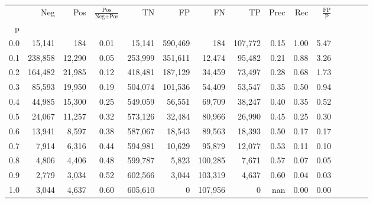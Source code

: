 \begin{tabular}{rrrcrrrrrrrrrrr}
\toprule
{} &      Neg &     Pos & $\frac{\text{Pos}}{\text{Neg}+\text{Pos}}$ &       TN &       FP &       FN &       TP &  Prec &   Rec & $\frac{\text{FP}}{\text{P}}$ \\
p   &          &         &                                            &          &          &          &          &       &       &                              \\
\midrule
0.0 &   15,141 &     184 &                                       0.01 &   15,141 &  590,469 &      184 &  107,772 &  0.15 &  1.00 &                         5.47 \\
0.1 &  238,858 &  12,290 &                                       0.05 &  253,999 &  351,611 &   12,474 &   95,482 &  0.21 &  0.88 &                         3.26 \\
0.2 &  164,482 &  21,985 &                                       0.12 &  418,481 &  187,129 &   34,459 &   73,497 &  0.28 &  0.68 &                         1.73 \\
0.3 &   85,593 &  19,950 &                                       0.19 &  504,074 &  101,536 &   54,409 &   53,547 &  0.35 &  0.50 &                         0.94 \\
0.4 &   44,985 &  15,300 &                                       0.25 &  549,059 &   56,551 &   69,709 &   38,247 &  0.40 &  0.35 &                         0.52 \\
0.5 &   24,067 &  11,257 &                                       0.32 &  573,126 &   32,484 &   80,966 &   26,990 &  0.45 &  0.25 &                         0.30 \\
0.6 &   13,941 &   8,597 &                                       0.38 &  587,067 &   18,543 &   89,563 &   18,393 &  0.50 &  0.17 &                         0.17 \\
0.7 &    7,914 &   6,316 &                                       0.44 &  594,981 &   10,629 &   95,879 &   12,077 &  0.53 &  0.11 &                         0.10 \\
0.8 &    4,806 &   4,406 &                                       0.48 &  599,787 &    5,823 &  100,285 &    7,671 &  0.57 &  0.07 &                         0.05 \\
0.9 &    2,779 &   3,034 &                                       0.52 &  602,566 &    3,044 &  103,319 &    4,637 &  0.60 &  0.04 &                         0.03 \\
1.0 &    3,044 &   4,637 &                                       0.60 &  605,610 &        0 &  107,956 &        0 &   nan &  0.00 &                         0.00 \\
\bottomrule
\end{tabular}
